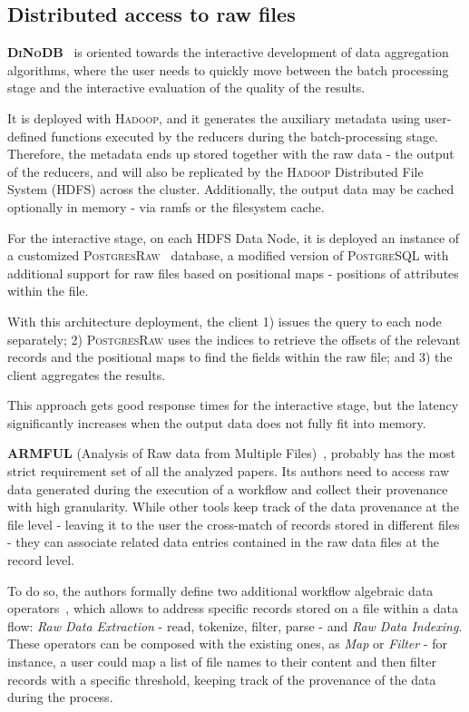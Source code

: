 \subsection{Distributed access to raw files}
\textbf{\textsc{DiNoDB}}~\cite{Tian2014} is oriented towards the interactive development
of data aggregation algorithms, where the user needs to quickly move between 
the batch processing stage and the interactive evaluation of the quality of 
the results.

It is deployed with \textsc{Hadoop}, and it generates the auxiliary metadata 
using user-defined functions executed by the reducers during the batch-processing
stage. Therefore, the metadata ends up stored together with the raw 
data - the output of the reducers, and will also be replicated by the \textsc{Hadoop} 
Distributed File System (\textsc{HDFS}) across the cluster. Additionally, the output 
data may be cached optionally in memory - via ramfs or the filesystem cache.

For the interactive stage, on each HDFS Data Node, it is deployed an 
instance of a customized \textsc{PostgresRaw}~\cite{Alagiannis2012Adaptive}
database, a modified version of \textsc{PostgreSQL} with additional support for 
raw files based on positional maps - positions of attributes within the file.

With this architecture deployment, the client 1) issues the query to each 
node separately; 2) \textsc{PostgresRaw} uses the indices to retrieve the offsets of the 
relevant records and the positional maps to find the fields within the 
raw file; and 3) the client aggregates the results.

This approach gets good response times for the interactive stage,
but the latency significantly increases when the output data does not 
fully fit into memory.

\medskip

\textbf{ARMFUL}  (Analysis of Raw data from Multiple Files)~\cite{Silva2017}, 
probably has the most strict requirement set of all the analyzed papers. Its 
authors need to access raw data generated during the execution of a 
workflow and collect their provenance with high granularity. While other 
tools keep track of the data provenance at the file level - leaving it to the user 
the cross-match of records stored in different files - they can 
associate related data entries contained in the raw data files at the record 
level.

To do so, the authors formally define two additional workflow 
algebraic data operators~\cite{Ogasawara2011}, which allows to address 
specific records stored on a file within a data flow: \emph{Raw Data Extraction} 
- read, tokenize, filter, parse - and \emph{Raw Data Indexing}. These 
operators can be composed with the existing ones, as \emph{Map} or 
\emph{Filter} - for instance, a user could map a list of file names to their 
content and then filter records with a specific threshold, keeping track of 
the provenance of the data during the process.

